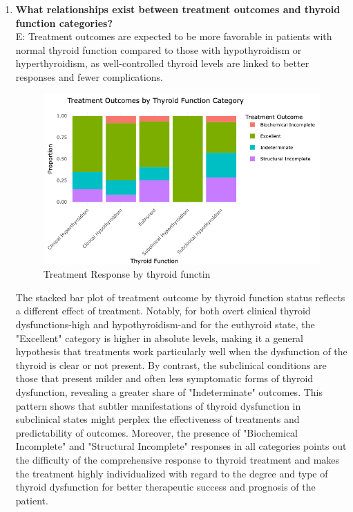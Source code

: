 \documentclass[12pt]{article}
\begin{document}
\begin{enumerate}
\newpage


\item \textbf{What relationships exist between treatment outcomes and thyroid function categories?} \\
E: Treatment outcomes are expected to be more favorable in patients with normal thyroid function compared to those with hypothyroidism or hyperthyroidism, as well-controlled thyroid levels are linked to better responses and fewer complications.

 \begin{figure}[h]
        \vspace{5pt}
        \centering
        \includegraphics[width=1\textwidth]{treatment vs throif.png}  
        \caption{Treatment Response by thyroid functin}
            \label{fig:example}
       \vspace{0.3cm}
    \end{figure}

The stacked bar plot of treatment outcome by thyroid function status reflects a different effect of treatment. Notably, for both overt clinical thyroid dysfunctions-high and hypothyroidism-and for the euthyroid state, the "Excellent" category is higher in absolute levels, making it a general hypothesis that treatments work particularly well when the dysfunction of the thyroid is clear or not present. By contrast, the subclinical conditions are those that present milder and often less symptomatic forms of thyroid dysfunction, revealing a greater share of "Indeterminate" outcomes. This pattern shows that subtler manifestations of thyroid dysfunction in subclinical states might perplex the effectiveness of treatments and predictability of outcomes. Moreover, the presence of "Biochemical Incomplete" and "Structural Incomplete" responses in all categories points out the difficulty of the comprehensive response to thyroid treatment and makes the treatment highly individualized with regard to the degree and type of thyroid dysfunction for better therapeutic success and prognosis of the patient.

\newpage



\end{enumerate}
\end{document}
